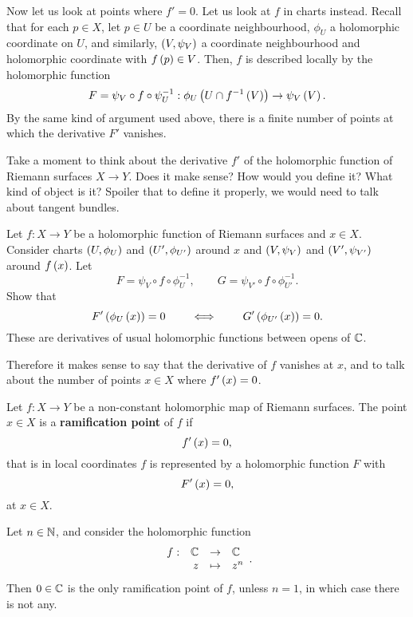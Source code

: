 Now let us look at points where $ f' = 0 $. Let us look at $ f $ in charts instead. Recall that for each $ p \in X $, let $ p \in U $ be a coordinate neighbourhood, $ \phi_U $ a holomorphic coordinate on $ U $, and similarly, $ \left( V, \psi_V \right) $ a coordinate neighbourhood and holomorphic coordinate with $ f\left( p \right) \in V $. Then, $ f $ is described locally by the holomorphic function
$$ F = \psi_V \circ f \circ \psi_U^{-1} : \phi_U\left( U \cap f^{-1}\left( V \right) \right) \to \psi_V\left( V \right). $$
By the same kind of argument used above, there is a finite number of points at which the derivative $ F' $ vanishes.

\begin{exercise}
Take a moment to think about the derivative $ f' $ of the holomorphic function of Riemann surfaces $ X \to Y $. Does it make sense? How would you define it? What kind of object is it? Spoiler that to define it properly, we would need to talk about tangent bundles.
\end{exercise}

\begin{exercise}
Let $ f : X \to Y $ be a holomorphic function of Riemann surfaces and $ x \in X $. Consider charts $ \left( U, \phi_U \right) $ and $ \left( U', \phi_{U'} \right) $ around $ x $ and $ \left( V, \psi_V \right) $ and $ \left( V', \psi_{V'} \right) $ around $ f\left( x \right) $. Let
$$ F = \psi_V \circ f \circ \phi_U^{-1}, \qquad G = \psi_{V'} \circ f \circ \phi_{U'}^{-1}. $$
Show that
$$ F'\left( \phi_U\left( x \right) \right) = 0 \qquad \iff \qquad G'\left( \phi_{U'}\left( x \right) \right) = 0. $$
These are derivatives of usual holomorphic functions between opens of $ \mathbb{C} $.
\end{exercise}

Therefore it makes sense to say that the derivative of $ f $ vanishes at $ x $, and to talk about the number of points $ x \in X $ where $ f'\left( x \right) = 0 $.

\begin{definition}
Let $ f : X \to Y $ be a non-constant holomorphic map of Riemann surfaces. The point $ x \in X $ is a \textbf{ramification point} of $ f $ if
$$ f'\left( x \right) = 0, $$
that is in local coordinates $ f $ is represented by a holomorphic function $ F $ with
$$ F'\left( x \right) = 0, $$
at $ x \in X $.
\end{definition}

\begin{example}
\label{eg:17.9}
Let $ n \in \mathbb{N} $, and consider the holomorphic function
$$ \function[f]{\C}{\C}{z}{z^n}. $$
Then $ 0 \in \mathbb{C} $ is the only ramification point of $ f $, unless $ n = 1 $, in which case there is not any.
\end{example}

